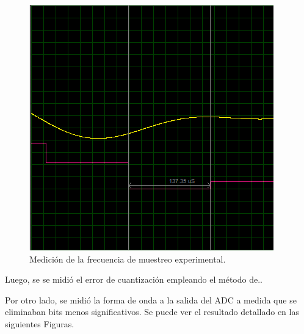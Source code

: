 \begin{multicols}{2}
\begin{figure}[H]
\centering
\includegraphics[width=0.9\linewidth]{ImagenesEjercicio1/med2.png}
\caption{Medición de la frecuencia de muestreo experimental.}
\label{med2}
\end{figure}

\end{multicols}

Luego, se se midió el error de cuantización empleando el método de..


Por otro lado, se midió la forma de onda a la salida del ADC a medida que se eliminaban bits menos significativos. Se puede ver el resultado detallado en las siguientes Figuras.

